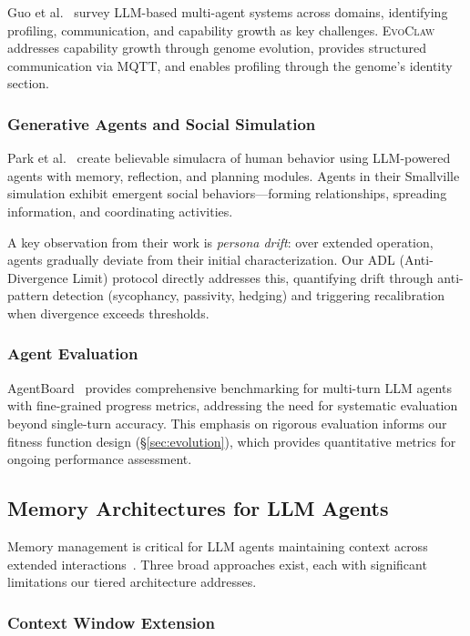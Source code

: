 \documentclass{article}
\newcommand{\evoclaw}{\textsc{EvoClaw}}
\begin{document}
Guo et al.~\cite{guo2024llm_multi_agents} survey LLM-based multi-agent systems across domains, identifying profiling, communication, and capability growth as key challenges. \evoclaw{} addresses capability growth through genome evolution, provides structured communication via MQTT, and enables profiling through the genome's identity section.

\subsubsection{Generative Agents and Social Simulation}

Park et al.~\cite{park2023generative} create believable simulacra of human behavior using LLM-powered agents with memory, reflection, and planning modules. Agents in their Smallville simulation exhibit emergent social behaviors—forming relationships, spreading information, and coordinating activities.

A key observation from their work is \textit{persona drift}: over extended operation, agents gradually deviate from their initial characterization. Our ADL (Anti-Divergence Limit) protocol directly addresses this, quantifying drift through anti-pattern detection (sycophancy, passivity, hedging) and triggering recalibration when divergence exceeds thresholds.

\subsubsection{Agent Evaluation}

AgentBoard~\cite{ma2024agentboard} provides comprehensive benchmarking for multi-turn LLM agents with fine-grained progress metrics, addressing the need for systematic evaluation beyond single-turn accuracy. This emphasis on rigorous evaluation informs our fitness function design (\S\ref{sec:evolution}), which provides quantitative metrics for ongoing performance assessment.

\subsection{Memory Architectures for LLM Agents}

Memory management is critical for LLM agents maintaining context across extended interactions~\cite{zhong2023token}. Three broad approaches exist, each with significant limitations our tiered architecture addresses.

\subsubsection{Context Window Extension}
\end{document}
